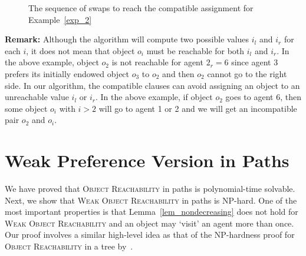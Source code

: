 \begin{example}
\begin{figure}[h!]
            \caption{The sequence of swaps to reach the compatible assignment for Example~\ref{exp_2}} \label{fig_ans}
    \end{figure}
\end{example}

\textbf{Remark:} Although the algorithm will compute two possible values $i_l$ and $i_r$ for each $i$, it does not mean that object $o_i$ must be reachable for both $i_l$ and $i_r$.
In the above example, object $o_2$ is not  reachable for agent $2_r=6$ since agent 3 prefers its initially endowed object $o_3$ to $o_2$ and then $o_2$ cannot go to the right side.
In our algorithm, the compatible clauses can avoid assigning an object to an unreachable value $i_l$ or $i_r$. In the above example, if object $o_2$ goes to agent 6, then some object $o_i$ with $i>2$ will go to agent 1 or 2 and we will get an incompatible pair $o_2$ and $o_i$.


\section{Weak Preference Version in Paths}\label{sec-wpath}
We have proved that \textsc{Object Reachability} in paths is polynomial-time solvable. Next, we show that  \textsc{Weak Object Reachability} in paths is NP-hard.
One of the most important properties is that  Lemma~\ref{lem_nondecreasing} does not hold for  \textsc{Weak Object Reachability} and an object may `visit' an agent more than once.
Our proof involves a similar high-level idea as that of the NP-hardness proof for \textsc{Object Reachability} in a tree by~\citet{DBLP:conf/ijcai/GourvesLW17}.

